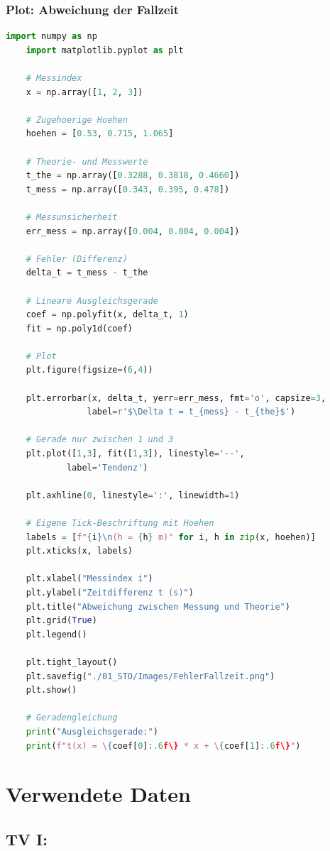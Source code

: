 \documentclass{report}
\begin{document}
\subsubsection*{Plot: Abweichung der Fallzeit}
\begin{scriptsize}
\lstset{style=python}
\begin{lstlisting}[language=python]
    import numpy as np
    import matplotlib.pyplot as plt

    # Messindex
    x = np.array([1, 2, 3])

    # Zugehoerige Hoehen
    hoehen = [0.53, 0.715, 1.065]

    # Theorie- und Messwerte
    t_the = np.array([0.3288, 0.3818, 0.4660])
    t_mess = np.array([0.343, 0.395, 0.478])

    # Messunsicherheit
    err_mess = np.array([0.004, 0.004, 0.004])

    # Fehler (Differenz)
    delta_t = t_mess - t_the

    # Lineare Ausgleichsgerade
    coef = np.polyfit(x, delta_t, 1)
    fit = np.poly1d(coef)

    # Plot
    plt.figure(figsize=(6,4))

    plt.errorbar(x, delta_t, yerr=err_mess, fmt='o', capsize=3,
                label=r'$\Delta t = t_{mess} - t_{the}$')

    # Gerade nur zwischen 1 und 3
    plt.plot([1,3], fit([1,3]), linestyle='--',
            label='Tendenz')

    plt.axhline(0, linestyle=':', linewidth=1)

    # Eigene Tick-Beschriftung mit Hoehen
    labels = [f"{i}\n(h = {h} m)" for i, h in zip(x, hoehen)]
    plt.xticks(x, labels)

    plt.xlabel("Messindex i")
    plt.ylabel("Zeitdifferenz t (s)")
    plt.title("Abweichung zwischen Messung und Theorie")
    plt.grid(True)
    plt.legend()

    plt.tight_layout()
    plt.savefig("./01_STO/Images/FehlerFallzeit.png")
    plt.show()

    # Geradengleichung
    print("Ausgleichsgerade:")
    print(f"t(x) = \{coef[0]:.6f\} * x + \{coef[1]:.6f\}")
\end{lstlisting}
\end{scriptsize}


\section{Verwendete Daten}
\subsection{TV I:}
\end{document}
